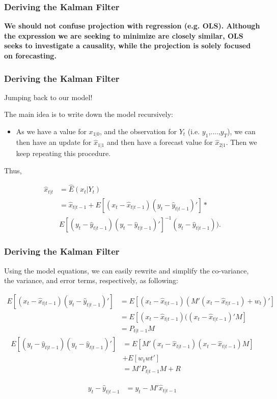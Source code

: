 \documentclass[notes=show]{beamer}%
\begin{document}
\begin{frame}
\frametitle{Deriving the Kalman Filter}

\textbf{We should not confuse projection with regression (e.g. OLS). Although the expression we are seeking to minimize are closely similar, OLS seeks to investigate a causality, while the projection is solely focused on forecasting.}
\end{frame}


\begin{frame}
\frametitle{Deriving the Kalman Filter}

Jumping back to our model! 

The main idea is to write down the model recursively:

\begin{itemize}
\item As we have a value for $x_{1|0}$, and the observation for $Y_{t}$ (i.e. $y_{1}$,....,$y_{T}$), we can then have an update for $\hat{x}_{1|1}$ and then have a forecast value for $\hat{x}_{2|1}$. Then we keep repeating this procedure.
\end{itemize}

Thus,

\begin{align}
\hat{x}_{t|t}&=\hat{E}(x_{t}|Y_{t}) \nonumber \\
&=\hat{x}_{t|t-1}+E[(x_{t}-\hat{x}_{t|t-1})(y_{t}-\hat{y}_{t|t-1})']* \nonumber\\
&E[(y_{t}-\hat{y}_{t|t-1})(y_{t}-\hat{y}_{t|t-1})']^{-1}(y_{t}-\hat{y}_{t|t-1})).
\end{align}

\end{frame}


\begin{frame}
\frametitle{Deriving the Kalman Filter}

Using the model equations, we can easily rewrite and simplify the co-variance, the variance, and error terms, respectively, as following:

\begin{align}
E[(x_{t}-\hat{x}_{t|t-1})(y_{t}-\hat{y}_{t|t-1})']&=E[(x_{t}-\hat{x}_{t|t-1})(M'(x_{t}-\hat{x}_{t|t-1})+w_{t})']\nonumber\\
&=E[(x_{t}-\hat{x}_{t|t-1})((x_{t}-\hat{x}_{t|t-1})'M]\nonumber\\
&=P_{t|t-1}M
\end{align}
\begin{align}
E[(y_{t}-\hat{y}_{t|t-1})(y_{t}-\hat{y}_{t|t-1})']&=E[M'(x_{t}-\hat{x}_{t|t-1})(x_{t}-\hat{x}_{t|t-1})M]\nonumber\\
&+E[w_{t}w{t}']\nonumber\\
&=M'P_{t|t-1}M+R
\end{align}

\begin{align}
y_{t}-\hat{y}_{t|t-1} &=y_{t} - M'\hat{x}_{t|t-1}
\end{align}

\end{frame}
\end{document}
